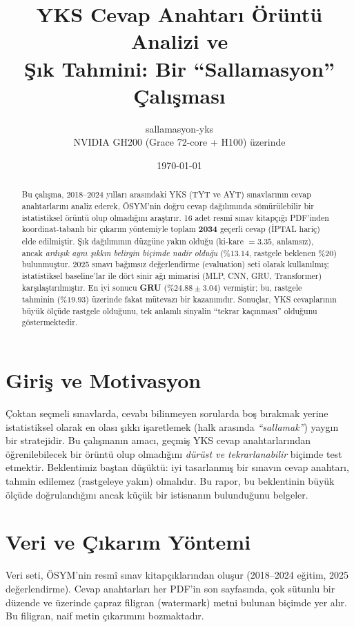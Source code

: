 \documentclass[11pt]{article}
\title{\textbf{YKS Cevap Anahtarı Örüntü Analizi ve\\
Şık Tahmini: Bir ``Sallamasyon'' Çalışması}}
\author{sallamasyon-yks \\ \small NVIDIA GH200 (Grace 72-core + H100) üzerinde}
\date{\today}
\begin{document}
\maketitle

\begin{abstract}
\noindent
Bu çalışma, 2018--2024 yılları arasındaki YKS (TYT ve AYT) sınavlarının
cevap anahtarlarını analiz ederek, ÖSYM'nin doğru cevap dağılımında
sömürülebilir bir istatistiksel örüntü olup olmadığını araştırır. 16 adet
resmî sınav kitapçığı PDF'inden koordinat-tabanlı bir çıkarım yöntemiyle
toplam \textbf{2034} geçerli cevap (İPTAL hariç) elde edilmiştir. Şık
dağılımının düzgüne yakın olduğu (ki-kare $=3.35$, anlamsız), ancak
\emph{ardışık aynı şıkkın belirgin biçimde nadir olduğu} ($\%13.14$, rastgele
beklenen $\%20$) bulunmuştur. 2025 sınavı bağımsız değerlendirme (evaluation)
seti olarak kullanılmış; istatistiksel baseline'lar ile dört sinir ağı
mimarisi (MLP, CNN, GRU, Transformer) karşılaştırılmıştır. En iyi sonucu
\textbf{GRU} ($\%24.88 \pm 3.04$) vermiştir; bu, rastgele tahminin
($\%19.93$) üzerinde fakat mütevazı bir kazanımdır. Sonuçlar, YKS
cevaplarının büyük ölçüde rastgele olduğunu, tek anlamlı sinyalin
``tekrar kaçınması'' olduğunu göstermektedir.
\end{abstract}

\section{Giriş ve Motivasyon}
Çoktan seçmeli sınavlarda, cevabı bilinmeyen sorularda boş bırakmak yerine
istatistiksel olarak en olası şıkkı işaretlemek (halk arasında
\emph{``sallamak''}) yaygın bir stratejidir. Bu çalışmanın amacı, geçmiş YKS
cevap anahtarlarından öğrenilebilecek bir örüntü olup olmadığını
\emph{dürüst ve tekrarlanabilir} biçimde test etmektir. Beklentimiz
baştan düşüktü: iyi tasarlanmış bir sınavın cevap anahtarı, tahmin
edilemez (rastgeleye yakın) olmalıdır. Bu rapor, bu beklentinin büyük
ölçüde doğrulandığını ancak küçük bir istisnanın bulunduğunu belgeler.

\section{Veri ve Çıkarım Yöntemi}
Veri seti, ÖSYM'nin resmî sınav kitapçıklarından oluşur (2018--2024 eğitim,
2025 değerlendirme). Cevap anahtarları her PDF'in son sayfasında, çok
sütunlu bir düzende ve üzerinde çapraz filigran (watermark) metni bulunan
biçimde yer alır. Bu filigran, naif metin çıkarımını bozmaktadır.
\end{document}
